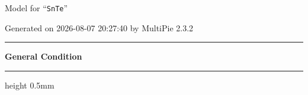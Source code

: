 \documentclass[fleqn,10pt,landscape]{jsarticle}
\begin{document}
\setcounter{MaxMatrixCols}{32}

\renewcommand{\tablename}{Table~}
\renewcommand{\figurename}{Figure~}
\setlength{\baselineskip}{16pt}
\setlength{\parindent}{0pt}
\setlength{\mathindent}{0pt}
\footnotesize
\begin{center}
\LARGE
Model for ``\texttt{SnTe}''
\end{center}
\begin{flushright}
Generated on 2026-08-07 20:27:40 by MultiPie 2.3.2
\end{flushright}
\setlength{\baselineskip}{16pt}
\footnotesize
\vspace{5mm}
\noindent \rule[0.5mm]{5mm}{0.5mm}\hspace{3mm}\textbf{General Condition}\hspace{3mm}\leaders\hrule height 0.5mm\hfill\kern0pt
\vspace{3mm}
\end{document}
